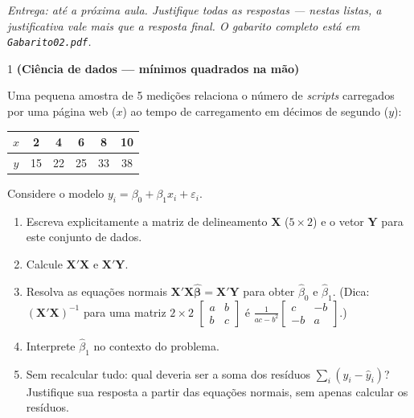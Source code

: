 \documentclass[11pt]{article}
\begin{document}

\noindent \textit{Entrega: até a próxima aula. Justifique todas as respostas — nestas listas, a
justificativa vale mais que a resposta final. O gabarito completo está em \texttt{Gabarito02.pdf}.}

\begin{questao}{1} \textbf{(Ciência de dados --- mínimos quadrados na mão)}

Uma pequena amostra de 5 medições relaciona o número de \emph{scripts} carregados por uma página
web ($x$) ao tempo de carregamento em décimos de segundo ($y$):

\begin{center}
\begin{tabular}{c|ccccc}
$x$ & 2 & 4 & 6 & 8 & 10 \\
\hline
$y$ & 15 & 22 & 25 & 33 & 38
\end{tabular}
\end{center}

Considere o modelo $y_i = \beta_0 + \beta_1 x_i + \varepsilon_i$.

\begin{enumerate}[label=(\alph*)]
  \item Escreva explicitamente a matriz de delineamento $\mathbf{X}$ ($5 \times 2$) e o vetor
    $\mathbf{Y}$ para este conjunto de dados.
  \item Calcule $\mathbf{X}'\mathbf{X}$ e $\mathbf{X}'\mathbf{Y}$.
  \item Resolva as equações normais $\mathbf{X}'\mathbf{X}\hat{\boldsymbol\beta} =
    \mathbf{X}'\mathbf{Y}$ para obter $\hat{\beta}_0$ e $\hat{\beta}_1$. (Dica:
    $(\mathbf{X}'\mathbf{X})^{-1}$ para uma matriz $2\times 2$
    $\begin{bmatrix} a & b \\ b & c\end{bmatrix}$ é $\frac{1}{ac-b^2}\begin{bmatrix} c & -b \\ -b &
    a \end{bmatrix}$.)
  \item Interprete $\hat{\beta}_1$ no contexto do problema.
  \item Sem recalcular tudo: qual deveria ser a soma dos resíduos $\sum_i (y_i - \hat y_i)$?
    Justifique sua resposta a partir das equações normais, sem apenas calcular os resíduos.
\end{enumerate}
\end{questao}
\end{document}
